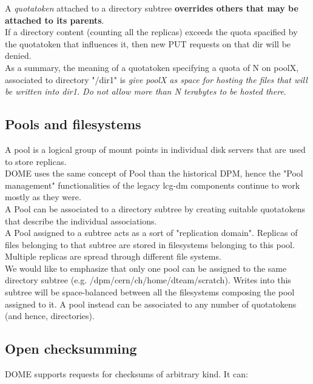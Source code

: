 \documentclass[a4paper,10pt]{scrreprt}
\begin{document}
A \textit{quotatoken} attached to a directory subtree \textbf{overrides others that may be attached to its parents}.\\
If a directory content (counting all the replicas) exceeds the quota spacified by the quotatoken that influences it,
then new PUT requests on that dir will be denied.\\

As a summary, the meaning of a quotatoken specifying a quota of N on poolX, associated to directory "/dir1" is \textit{give poolX as
space for hosting the files that will be written into \/dir1. Do not allow more than N terabytes to be hosted there}.\\

\subsection{Pools and filesystems}
A pool is a logical group of mount points in individual disk servers that are used to store replicas.\\

DOME uses the same concept of Pool than the historical DPM, hence the "Pool management" functionalities
of the legacy lcg-dm components continue to work mostly as they were.\\

A Pool can be associated to a directory subtree by creating suitable quotatokens that describe the individual associations.\\

A Pool assigned to a subtree acts as a sort of "replication domain". Replicas of files belonging to that subtree
are stored in filesystems belonging to this pool. Multiple replicas are spread through different file systems.\\

We would like to emphasize that only one pool can be assigned to the same directory subtree (e.g. /dpm/cern/ch/home/dteam/scratch).
Writes into this subtree will be space-balanced between all the filesystems composing the pool assigned to it. A pool instead can be associated
to any number of quotatokens (and hence, directories).\\

\subsection{Open checksumming}
DOME supports requests for checksums of arbitrary kind. It can:\\
\end{document}
